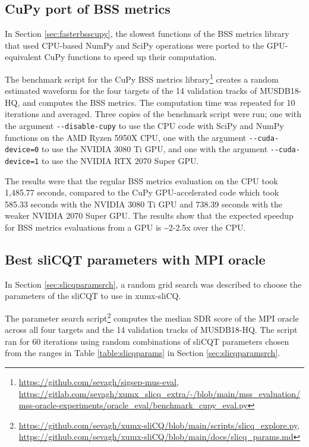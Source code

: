\documentclass[report.tex]{subfiles}
\begin{document}
\subsection{CuPy port of BSS metrics}
\label{sec:gpuexperimentpytorch}

In Section \ref{sec:fasterbsscupy}, the slowest functions of the BSS metrics library that used CPU-based NumPy and SciPy operations were ported to the GPU-equivalent CuPy functions to speed up their computation.

The benchmark script for the CuPy BSS metrics library\footnote{\url{https://github.com/sevagh/sigsep-mus-eval}, \url{https://gitlab.com/sevagh/xumx_slicq_extra/-/blob/main/mss_evaluation/mss-oracle-experiments/oracle_eval/benchmark_cupy_eval.py}} creates a random estimated waveform for the four targets of the 14 validation tracks of MUSDB18-HQ, and computes the BSS metrics. The computation time was repeated for 10 iterations and averaged. Three copies of the benchmark script were run; one with the argument \Verb#--disable-cupy# to use the CPU code with SciPy and NumPy functions on the AMD Ryzen 5950X CPU, one with the argument \Verb#--cuda-device=0# to use the NVIDIA 3080 Ti GPU, and one with the argument \Verb#--cuda-device=1# to use the NVIDIA RTX 2070 Super GPU.

The results were that the regular BSS metrics evaluation on the CPU took 1,485.77 seconds, compared to the CuPy GPU-accelerated code which took 585.33 seconds with the NVIDIA 3080 Ti GPU and 738.39 seconds with the weaker NVIDIA 2070 Super GPU. The results show that the expected speedup for BSS metrics evaluations from a GPU is \textasciitilde 2-2.5x over the CPU.

\subsection{Best sliCQT parameters with MPI oracle}
\label{sec:slicqparamresults}

In Section \ref{sec:slicqparamsrch}, a random grid search was described to choose the parameters of the sliCQT to use in xumx-sliCQ.

The parameter search script\footnote{\url{https://github.com/sevagh/xumx-sliCQ/blob/main/scripts/slicq_explore.py}, \url{https://github.com/sevagh/xumx-sliCQ/blob/main/docs/slicq_params.md}} computes the median SDR score of the MPI oracle across all four targets and the 14 validation tracks of MUSDB18-HQ. The script ran for 60 iterations using random combinations of sliCQT parameters chosen from the ranges in Table \ref{table:slicqparams} in Section \ref{sec:slicqparamsrch}.
\end{document}

